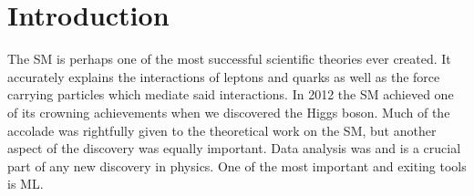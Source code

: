 \chapter*{Introduction}
The \ac{SM} is perhaps one of the most successful scientific theories ever created. It accurately explains the interactions of leptons and quarks 
as well as the force carrying particles which mediate said interactions. In 2012 the \ac{SM} achieved one of its crowning achievements when we 
discovered the Higgs boson. Much of the accolade was rightfully given to the theoretical work on the \ac{SM}, but another aspect of the discovery 
was equally important. Data analysis was and is a crucial part of any new discovery in physics. One of the most important and exiting tools is \ac{ML}.




